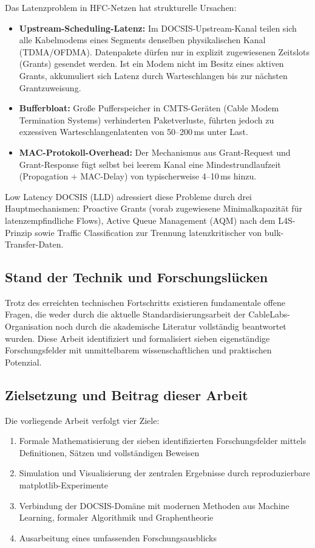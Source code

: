 ﻿\documentclass[a4paper,12pt]{article}
\theoremstyle{definition}
\begin{document}
Das Latenzproblem in HFC-Netzen hat strukturelle Ursachen:
\begin{itemize}
    \item \textbf{Upstream-Scheduling-Latenz:} Im DOCSIS-Upstream-Kanal teilen sich
          alle Kabelmodems eines Segments denselben physikalischen Kanal (TDMA/OFDMA).
          Datenpakete d\"{u}rfen nur in explizit zugewiesenen Zeitslots (Grants) gesendet
          werden. Ist ein Modem nicht im Besitz eines aktiven Grants, akkumuliert sich
          Latenz durch Warteschlangen bis zur n\"{a}chsten Grantzuweisung.
    \item \textbf{Bufferbloat:} Gro{\ss}e Pufferspeicher in CMTS-Ger\"{a}ten (Cable Modem
          Termination Systems) verhinderten Paketverluste, f\"{u}hrten jedoch zu exzessiven
          Warteschlangenlatenten von 50--200\,ms unter Last.
    \item \textbf{MAC-Protokoll-Overhead:} Der Mechanismus aus Grant-Request und
          Grant-Response f\"{u}gt selbst bei leerem Kanal eine Mindestrundlaufzeit
          (Propagation + MAC-Delay) von typischerweise 4--10\,ms hinzu.
\end{itemize}

Low Latency DOCSIS (LLD) adressiert diese Probleme durch drei Hauptmechanismen:
Proactive Grants (vorab zugewiesene Minimalkapazit\"{a}t f\"{u}r latenzempfindliche Flows),
Active Queue Management (AQM) nach dem L4S-Prinzip \cite{briscoe2023l4s} sowie
Traffic Classification zur Trennung latenzkritischer von bulk-Transfer-Daten.

\subsection{Stand der Technik und Forschungsl\"{u}cken}

Trotz des erreichten technischen Fortschritts existieren fundamentale offene
Fragen, die weder durch die aktuelle Standardisierungsarbeit der
CableLabs-Organisation noch durch die akademische Literatur vollst\"{a}ndig
beantwortet wurden. Diese Arbeit identifiziert und formalisiert sieben
eigenst\"{a}ndige Forschungsfelder mit unmittelbarem wissenschaftlichen und
praktischen Potenzial.

\subsection{Zielsetzung und Beitrag dieser Arbeit}

Die vorliegende Arbeit verfolgt vier Ziele:
\begin{enumerate}
    \item Formale Mathematisierung der sieben identifizierten Forschungsfelder
          mittels Definitionen, S\"{a}tzen und vollst\"{a}ndigen Beweisen
    \item Simulation und Visualisierung der zentralen Ergebnisse durch
          reproduzierbare matplotlib-Experimente
    \item Verbindung der DOCSIS-Domäne mit modernen Methoden aus Machine Learning,
          formaler Algorithmik und Graphentheorie
    \item Ausarbeitung eines umfassenden Forschungsausblicks
\end{enumerate}
\end{document}

